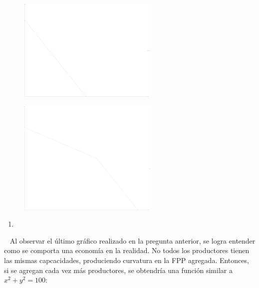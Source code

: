 \documentclass[
  letterpaper,
  DIV=11,
  numbers=noendperiod]{scrreport}
\providecommand{\tightlist}{%
  \setlength{\itemsep}{0pt}\setlength{\parskip}{0pt}}\usepackage{longtable,booktabs,array}
\begin{document}
\begin{figure}

{\centering \includegraphics[width=0.6\textwidth,height=\textheight]{7,8titulo_files/figure-pdf/unnamed-chunk-5-1.pdf}

}

\end{figure}

\begin{figure}

{\centering \includegraphics[width=0.6\textwidth,height=\textheight]{7,8titulo_files/figure-pdf/unnamed-chunk-6-1.pdf}

}

\end{figure}

\begin{enumerate}
\def\labelenumi{\alph{enumi})}
\setcounter{enumi}{3}
\tightlist
\item
\end{enumerate}

~ Al observar el último gráfico realizado en la pregunta anterior, se
logra entender como se comporta una economía en la realidad. No todos
los productores tienen las mismas capcacidades, produciendo curvatura en
la FPP agregada. Entonces, si se agregan cada vez más productores, se
obtendría una función similar a \(x^2+y^2 = 100\):
\end{document}
